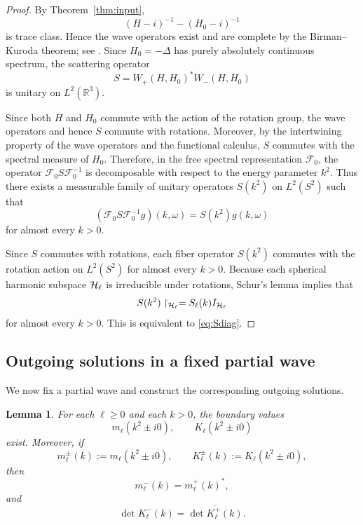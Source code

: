 \documentclass[a4paper,11pt]{article}
\numberwithin{equation}{section}
\newcommand{\R}{\mathbb{R}}
\newtheorem{lem}[thm]{Lemma}
\theoremstyle{definition}
\theoremstyle{remark}
\begin{document}
\begin{proof}
By Theorem~\ref{thm:input},
$$
(H-i)^{-1}-(H_0-i)^{-1}
$$
is trace class. Hence the wave operators exist and are complete by the
Birman--Kuroda theorem; see \cite[Ch.~XI]{ReedSimonIII}.
Since $H_0=-\Delta$ has purely absolutely continuous spectrum, the
scattering operator
$$
S=W_+(H,H_0)^*W_-(H,H_0)
$$
is unitary on $L^2(\R^3)$.

Since both $H$ and $H_0$ commute with the action of the rotation group, the
wave operators and hence $S$ commute with rotations. Moreover, by the
intertwining property of the wave operators and the functional calculus,
$S$ commutes with the spectral measure of $H_0$. Therefore, in the free
spectral representation $\mathcal F_0$, the operator
$\mathcal F_0 S\mathcal F_0^{-1}$ is decomposable with respect to the energy
parameter $k^2$. Thus there exists a measurable family of unitary operators
$S(k^2)$ on $L^2(S^2)$ such that
$$
(\mathcal F_0 S\mathcal F_0^{-1}g)(k,\omega)=S(k^2)g(k,\omega)
$$
for almost every $k>0$.

Since $S$ commutes with rotations, each fiber operator $S(k^2)$ commutes with
the rotation action on $L^2(S^2)$ for almost every $k>0$. Because each
spherical harmonic subspace ${\cal H}_\ell$ is irreducible under rotations,
Schur's lemma implies that
$$
S(k^2)\upharpoonright_{{\cal H}_\ell}=S_\ell(k)I_{{\cal H}_\ell}
$$
for almost every $k>0$. This is equivalent to \eqref{eq:Sdiag}.
\end{proof}

\subsection{Outgoing solutions in a fixed partial wave}

We now fix a partial wave and construct the corresponding outgoing solutions.

\begin{lem}
\label{lem:Kell-boundary}
For each $\ell\ge0$ and each $k>0$, the boundary values
\[
m_\ell(k^2\pm i0),
\qquad
K_\ell(k^2\pm i0)
\]
exist. Moreover, if
\[
m_\ell^\pm(k):=m_\ell(k^2\pm i0),
\qquad
K_\ell^\pm(k):=K_\ell(k^2\pm i0),
\]
then
\[
m_\ell^-(k)=m_\ell^+(k)^*,
\]
and
\[
\det K_\ell^-(k)=\overline{\det K_\ell^+(k)}.
\]
\end{lem}
\end{document}
